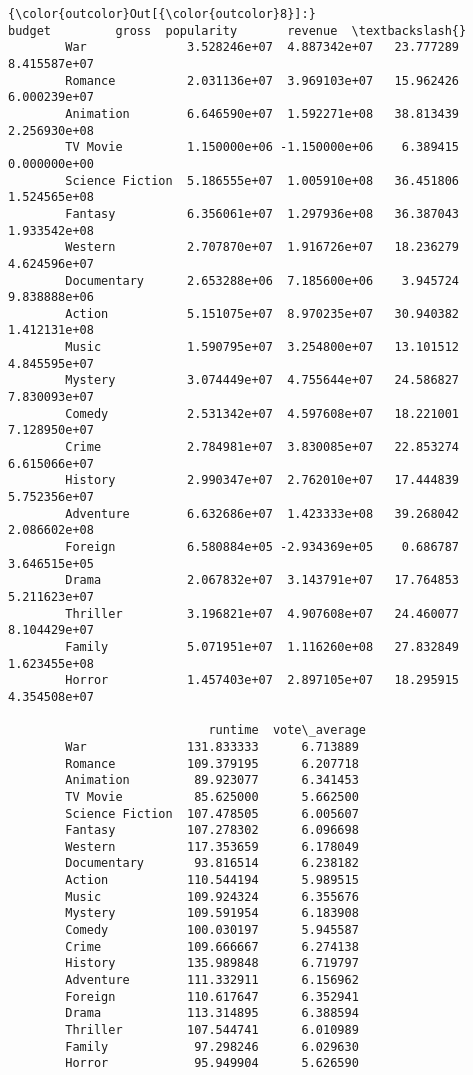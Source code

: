 \documentclass[11pt]{article}
\begin{document}
\begin{Verbatim}[commandchars=\\\{\}]
{\color{outcolor}Out[{\color{outcolor}8}]:}                        budget         gross  popularity       revenue  \textbackslash{}
        War              3.528246e+07  4.887342e+07   23.777289  8.415587e+07   
        Romance          2.031136e+07  3.969103e+07   15.962426  6.000239e+07   
        Animation        6.646590e+07  1.592271e+08   38.813439  2.256930e+08   
        TV Movie         1.150000e+06 -1.150000e+06    6.389415  0.000000e+00   
        Science Fiction  5.186555e+07  1.005910e+08   36.451806  1.524565e+08   
        Fantasy          6.356061e+07  1.297936e+08   36.387043  1.933542e+08   
        Western          2.707870e+07  1.916726e+07   18.236279  4.624596e+07   
        Documentary      2.653288e+06  7.185600e+06    3.945724  9.838888e+06   
        Action           5.151075e+07  8.970235e+07   30.940382  1.412131e+08   
        Music            1.590795e+07  3.254800e+07   13.101512  4.845595e+07   
        Mystery          3.074449e+07  4.755644e+07   24.586827  7.830093e+07   
        Comedy           2.531342e+07  4.597608e+07   18.221001  7.128950e+07   
        Crime            2.784981e+07  3.830085e+07   22.853274  6.615066e+07   
        History          2.990347e+07  2.762010e+07   17.444839  5.752356e+07   
        Adventure        6.632686e+07  1.423333e+08   39.268042  2.086602e+08   
        Foreign          6.580884e+05 -2.934369e+05    0.686787  3.646515e+05   
        Drama            2.067832e+07  3.143791e+07   17.764853  5.211623e+07   
        Thriller         3.196821e+07  4.907608e+07   24.460077  8.104429e+07   
        Family           5.071951e+07  1.116260e+08   27.832849  1.623455e+08   
        Horror           1.457403e+07  2.897105e+07   18.295915  4.354508e+07   
        
                            runtime  vote\_average  
        War              131.833333      6.713889  
        Romance          109.379195      6.207718  
        Animation         89.923077      6.341453  
        TV Movie          85.625000      5.662500  
        Science Fiction  107.478505      6.005607  
        Fantasy          107.278302      6.096698  
        Western          117.353659      6.178049  
        Documentary       93.816514      6.238182  
        Action           110.544194      5.989515  
        Music            109.924324      6.355676  
        Mystery          109.591954      6.183908  
        Comedy           100.030197      5.945587  
        Crime            109.666667      6.274138  
        History          135.989848      6.719797  
        Adventure        111.332911      6.156962  
        Foreign          110.617647      6.352941  
        Drama            113.314895      6.388594  
        Thriller         107.544741      6.010989  
        Family            97.298246      6.029630  
        Horror            95.949904      5.626590  
\end{Verbatim}
            
\end{document}
